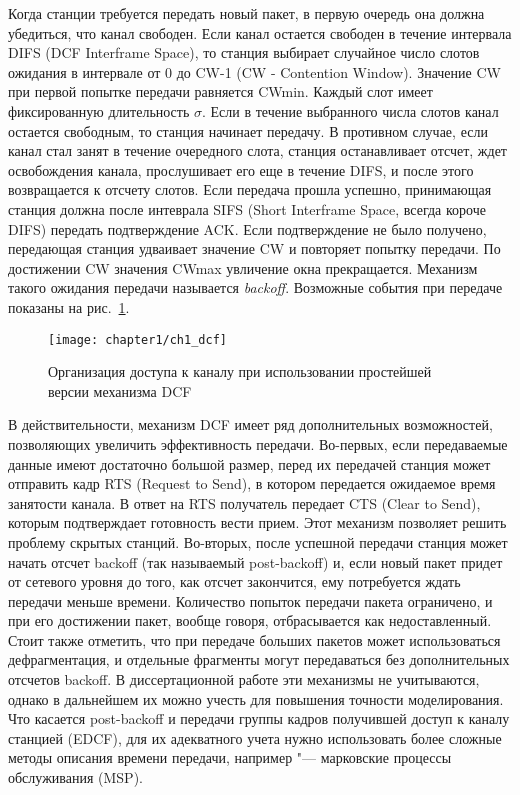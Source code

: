 Когда станции требуется передать новый пакет, в первую очередь она должна убедиться, что канал свободен. Если канал остается свободен в течение интервала DIFS (DCF Interframe Space), то станция выбирает случайное число слотов ожидания в интервале от 0 до CW-1 (CW - Contention Window). Значение CW при первой попытке передачи равняется CWmin. Каждый слот имеет фиксированную длительность $\sigma$. Если в течение выбранного числа слотов канал остается свободным, то станция начинает передачу. В противном случае, если канал стал занят в течение очередного слота, станция останавливает отсчет, ждет освобождения канала, прослушивает его еще в течение DIFS, и после этого возвращается к отсчету слотов. Если передача прошла успешно, принимающая станция должна после интеврала SIFS (Short Interframe Space, всегда короче DIFS) передать подтверждение ACK. Если подтверждение не было получено, передающая станция удваивает значение CW и повторяет попытку передачи. По достижении CW значения CWmax увличение окна прекращается. Механизм такого ожидания передачи называется \textit{backoff}. Возможные события при передаче показаны на рис.~\ref{fig:ch1_dcf}.

\begin{figure}[h!]
   \centering
    \texttt{[image: chapter1/ch1\_dcf]}
	\caption{Организация доступа к каналу при использовании простейшей версии механизма DCF}
	\label{fig:ch1_dcf}
\end{figure}

В действительности, механизм DCF имеет ряд дополнительных возможностей, позволяющих увеличить эффективность передачи. Во-первых, если передаваемые данные имеют достаточно большой размер, перед их передачей станция может отправить кадр RTS (Request to Send), в котором передается ожидаемое время занятости канала. В ответ на RTS получатель передает CTS (Clear to Send), которым подтверждает готовность вести прием. Этот механизм позволяет решить проблему скрытых станций. Во-вторых, после успешной передачи станция может начать отсчет backoff (так называемый post-backoff) и, если новый пакет придет от сетевого уровня до того, как отсчет закончится, ему потребуется ждать передачи меньше времени. Количество попыток передачи пакета ограничено, и при его достижении пакет, вообще говоря, отбрасывается как недоставленный. Стоит также отметить, что при передаче больших пакетов может использоваться дефрагментация, и отдельные фрагменты могут передаваться без дополнительных отсчетов backoff. В диссертационной работе эти механизмы не учитываются, однако в дальнейшем их можно учесть для повышения точности моделирования. Что касается post-backoff и передачи группы кадров получившей доступ к каналу станцией (EDCF), для их адекватного учета нужно использовать более сложные методы описания времени передачи, например "--- марковские процессы обслуживания (MSP).



